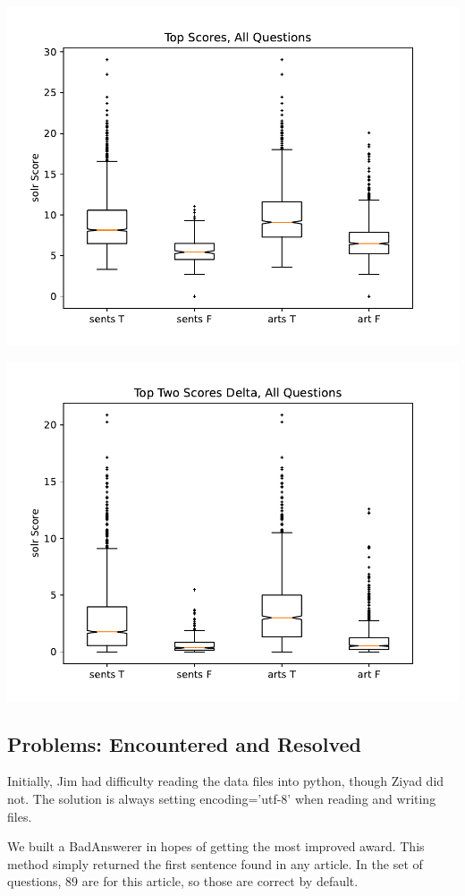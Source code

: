 \documentclass[11pt]{article}
\begin{document}
    \includegraphics[trim={0 0 0 0},clip,scale=0.9]{fig/bt-all.pdf}
    
    \includegraphics[trim={0 0 0 0},clip,scale=0.9]{fig/bd-all.pdf}

\subsection{Problems: Encountered and Resolved}

Initially, Jim had difficulty reading the data files into python, though Ziyad did not. The solution is always setting encoding='utf-8' when reading and writing files.

We built a BadAnswerer in hopes of getting the most improved award. This method simply returned the first sentence found in any article.  In the set of questions, 89 are for this article, so those are correct by default.
\end{document}
